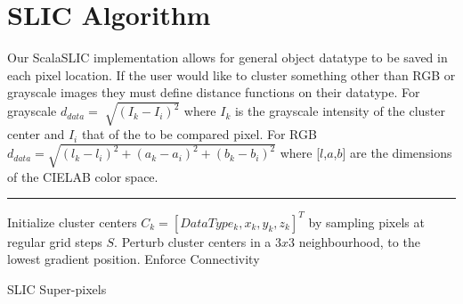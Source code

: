 \section{SLIC Algorithm}\label{sec:slicAlgo}

Our ScalaSLIC implementation allows for general object datatype to be saved in each pixel location. If the user would like to cluster something other than RGB or grayscale images they must define distance functions on their datatype. For grayscale $d_{data}=\sqrt[]{(I_k-I_i)^2}$ where $I_k$ is the grayscale intensity of the cluster center and $I_i$ that of the to be compared pixel. For RGB $d_{data}=\sqrt{(l_k - l_i)^2+(a_k - a_i)^2+(b_k - b_i)^2}$ where [$l$,$a$,$b$] are the dimensions of the CIELAB color space. 
\\
\begin{samepage}
  \rule{\textwidth}{2pt}
\begin{algorithm}[H]\label{algo:slic}
Initialize cluster centers $C_k=[DataType_k,x_k,y_k,z_k]^T$ by sampling pixels at regular grid steps $S$.
Perturb cluster centers in a $3 x 3$ neighbourhood, to the lowest gradient position. 
     Enforce Connectivity
     \caption{ SLIC Super-pixels }
  \end{algorithm}
\hrulefill
\end{samepage}

